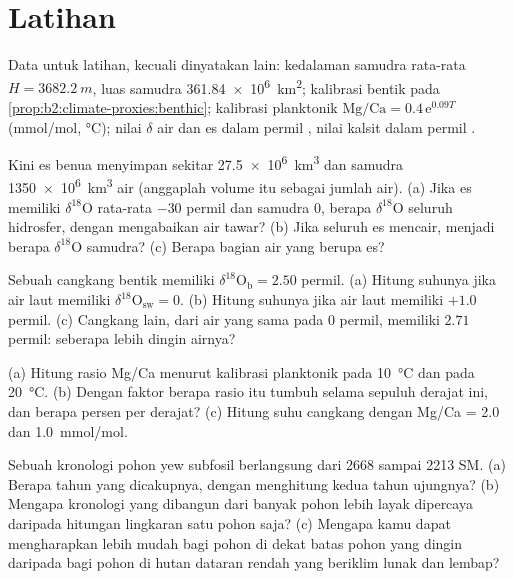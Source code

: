 \section*{Latihan}\label{sec:b2:climate-proxies:exercises}

Data untuk latihan, kecuali dinyatakan lain: kedalaman samudra rata-rata $H = \qty{3682.2}{m}$, luas
samudra \qty{361.84e6}{km^2}; kalibrasi bentik pada \cref{prop:b2:climate-proxies:benthic}; kalibrasi
planktonik $\text{Mg/Ca} = 0.4\,\mathrm{e}^{0.09T}$ (\unit{mmol/mol}, \unit{\celsius});
nilai $\delta$ air dan es dalam permil , nilai kalsit dalam permil .

\begin{exercise}[$\star$]\label{exo:b2:climate-proxies:1}
Kini es benua menyimpan sekitar \qty{27.5e6}{km^3} dan samudra \qty{1350e6}{km^3}
air (anggaplah volume itu sebagai jumlah air). (a) Jika es memiliki $\delta^{18}$O rata-rata $-30$
permil dan samudra 0, berapa $\delta^{18}$O seluruh hidrosfer, dengan mengabaikan air
tawar? (b) Jika seluruh es mencair, menjadi berapa $\delta^{18}$O samudra? (c) Berapa
bagian air yang berupa es?
\end{exercise}

\begin{exercise}[$\star$]\label{exo:b2:climate-proxies:2}
Sebuah cangkang bentik memiliki $\delta^{18}\mathrm{O}_{\mathrm{b}} = 2.50$ permil. (a) Hitung
suhunya jika air laut memiliki $\delta^{18}\mathrm{O}_{\mathrm{sw}} = 0$. (b) Hitung suhunya jika
air laut memiliki $+1.0$ permil. (c) Cangkang lain, dari air yang sama pada $0$ permil, memiliki
$2.71$ permil: seberapa lebih dingin airnya?
\end{exercise}

\begin{exercise}[$\star$]\label{exo:b2:climate-proxies:3}
(a) Hitung rasio Mg/Ca menurut kalibrasi planktonik pada \qty{10}{\celsius} dan pada
\qty{20}{\celsius}. (b) Dengan faktor berapa rasio itu tumbuh selama sepuluh derajat ini, dan berapa
persen per derajat? (c) Hitung suhu cangkang dengan Mg/Ca = 2.0 dan
\qty{1.0}{mmol/mol}.
\end{exercise}

\begin{exercise}[$\star$]\label{exo:b2:climate-proxies:4}
Sebuah kronologi pohon yew subfosil berlangsung dari 2668 sampai 2213 SM. (a) Berapa tahun yang dicakupnya,
dengan menghitung kedua tahun ujungnya? (b) Mengapa kronologi yang dibangun dari banyak pohon lebih layak dipercaya daripada
hitungan lingkaran satu pohon saja? (c) Mengapa kamu dapat mengharapkan  lebih mudah bagi
pohon di dekat batas pohon yang dingin daripada bagi pohon di hutan dataran rendah yang beriklim lunak dan lembap?
\end{exercise}

